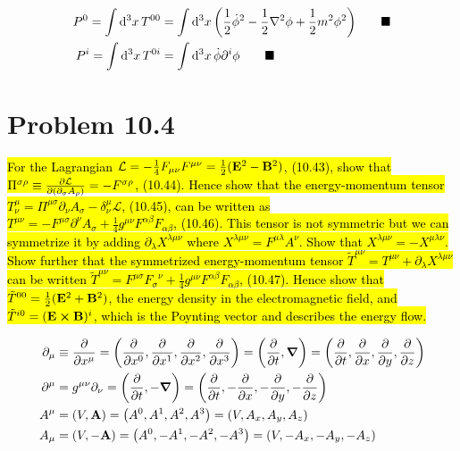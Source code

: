 \documentclass{article}
\begin{document}
\begin{align*}
  P^0=\int\dd[3]{x}T^{00} & = \int\dd[3]{x}\pqty{\frac{1}{2}\dot{ \phi}^2-\frac{1}{2}\laplacian\phi+\frac{1}{2}m^2\phi^2}\qquad\blacksquare \\
  P^i=\int\dd[3]{x}T^{0i} & = \int\dd[3]{x}\dot{\phi}\partial^i \phi\qquad\blacksquare                                                      \\
\end{align*}



\section*{Problem 10.4}
\begin{quoting}
  \hl{For the Lagrangian $\mathcal{L}=-\frac{1}{4}F_{\mu\nu}F^{\mu\nu}=\frac{1}{2}(\vb{E}^2-\vb{B}^2)$, (10.43), show that $\Pi^{\sigma\rho}\equiv\pdv{\mathcal{L}}{(\partial_\sigma A_\rho)}=-F^{\sigma\rho}$, (10.44). Hence show that the energy-momentum tensor $T^\mu_\nu=\Pi^{\mu\sigma} \partial_\nu A_\sigma-\delta^\mu_\nu \mathcal{L}$, (10.45), can be written as\\ $T^{\mu\nu}=-F^{\mu\sigma}\partial^\nu A_\sigma+\frac{1}{4}g^{\mu\nu}F^{\alpha\beta}F_{\alpha\beta}$, (10.46). This tensor is not symmetric but we can symmetrize it by adding $\partial_\lambda X^{\lambda\mu\nu}$ where $X^{\lambda\mu\nu}=F^{\mu\lambda}A^\nu$. Show that $X^{\lambda\mu\nu}=-X^{\mu\lambda\nu}$. Show further that the symmetrized energy-momentum tensor $\tilde{T}^{\mu\nu}=T^{\mu\nu}+\partial_\lambda X^{\lambda\mu\nu}$ can be written $\tilde{T}^{\mu\nu}=F^{\mu\sigma}{F_\sigma}^\nu+\frac{1}{4}g^{\mu\nu}F^{\alpha\beta}F_{\alpha\beta}$, (10.47). Hence show that $\tilde{T}^{00}=\frac{1}{2}(\vb{E}^2+\vb{B}^2)$, the energy density in the electromagnetic field, and $\tilde{T}^{i0}=(\vb{E}\cross\vb{B})^i$, which is the Poynting vector and describes the energy flow.}
\end{quoting}

\begin{align*}
  \partial_\mu & \equiv\pdv{x^\mu}=\pqty{\pdv{x^0},\pdv{x^1},\pdv{x^2},\pdv{x^3}}=\pqty{\pdv{t},\grad}=\pqty{\pdv{t},\pdv{x},\pdv{y},\pdv{z}} \\
  \partial^\mu & =g^{\mu\nu}\partial_\nu=\pqty{\pdv{t},-\grad}=\pqty{\pdv{t},-\pdv{x},-\pdv{y},-\pdv{z}}                                      \\
  A^\mu        & = \pqty{V,\vb{A}}= \pqty{A^0,A^1,A^2,A^3} = \pqty{V,A_x,A_y,A_z}                                                             \\
  A_\mu        & = \pqty{V,-\vb{A}}= \pqty{A^0,-A^1,-A^2,-A^3}= \pqty{V,-A_x,-A_y,-A_z}                                                       \\
\end{align*}
\end{document}
